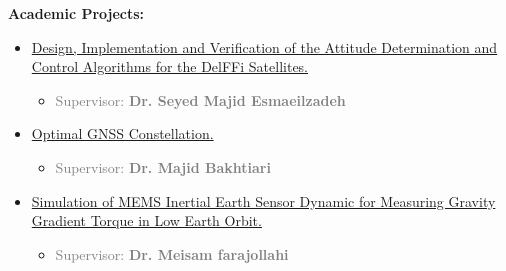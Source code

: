 \documentclass[11pt,a4paper, sans]{moderncv}
\begin{document}
	\textbf{Academic Projects:}
	\begin{itemize}
	\item \href{https://github.com/siavashsabzy/DelFFi}{Design, Implementation and Verification of the Attitude Determination and Control Algorithms for the DelFFi Satellites.}
	\begin{itemize}
		\item \textcolor{gray}{Supervisor: \textbf{ Dr. Seyed Majid Esmaeilzadeh} }
	\end{itemize}
	\item \href{https://github.com/siavashsabzy/ss_constellation_optimization}{Optimal GNSS Constellation.}
	\begin{itemize}
		\item \textcolor{gray}{Supervisor: \textbf{Dr. Majid Bakhtiari} }
	\end{itemize}
	\item \href{https://github.com/siavashsabzy/Gravity-Gradient-MEMS-Sensor}{Simulation of MEMS Inertial Earth Sensor Dynamic for Measuring Gravity Gradient Torque in Low Earth Orbit.}
	\begin{itemize}
		\item \textcolor{gray}{Supervisor: \textbf{Dr. Meisam farajollahi} }
	\end{itemize}
	
	\end{itemize}

	\vspace{5pt}
\end{document}
